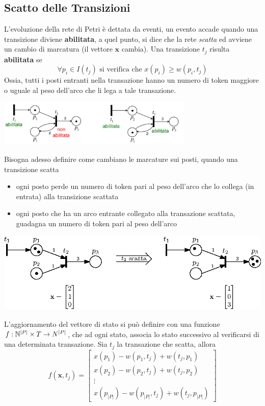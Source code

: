 \documentclass[10pt, letterpaper]{report}
\begin{document}
\subsection{Scatto delle Transizioni}
L'evoluzione della rete di Petri è dettata da eventi, un evento accade quando una transizione diviene \textbf{abilitata}, a quel punto, si dice che la rete \textit{scatta} ed avviene un cambio di marcatura (il vettore $\mathbf x$ cambia).\acc 
Una transizione $t_j$ risulta \textbf{abilitata} se 
$$ \forall p_i\in I(t_j) \text{ si verifica che }x(p_i)\ge w(p_i,t_j)$$
Ossia, tutti i posti entranti nella transazione hanno un numero di token maggiore o uguale al peso dell'arco che li lega a tale transazione.
\begin{center}
    \includegraphics[width=0.7\textwidth]{images/petriAbilitata.png}
\end{center}
Bisogna adesso definire come cambiano le marcature sui posti, quando una transizione scatta\begin{itemize}
    \item ogni posto perde un numero di token pari al peso dell'arco che lo collega (in entrata) alla transizione scattata
    \item ogni posto che ha un arco entrante collegato alla transazione scattata, guadagna un numero di token pari al peso dell'arco
\end{itemize}
\begin{center}
    \includegraphics[width=\textwidth]{images/scattoPetri.eps}
\end{center}
L'aggiornamento del vettore di stato si può definire con una funzione $f:{\mathbb N}^{|P|}\times T \rightarrow N^{|P|}$, che ad ogni stato, associa lo stato successivo al verificarsi di una determinata transazione. Sia $t_j$ la transazione che scatta, allora 
$$ f(\mathbf x,t_j) = \begin{bmatrix}
    x(p_1) - w(p_1,t_j)+w(t_j,p_1)\\ 
    x(p_2) - w(p_2,t_j)+w(t_j,p_2)\\ 
    \vdots \\ 
    x(p_{|P|}) - w(p_{|P|},t_j)+w(t_j,p_{|P|})
\end{bmatrix}$$
\end{document}
